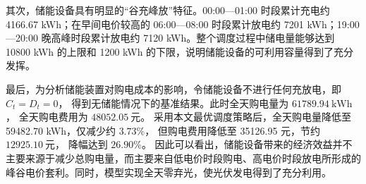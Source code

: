 其次，储能设备具有明显的“谷充峰放”特征。00:00—01:00 时段累计充电约 4166.67 kWh；在早间电价较高的 06:00—08:00 时段累计放电约 7201 kWh；19:00—20:00 晚高峰时段累计放电约 7120 kWh。整个调度过程中储电量能够达到 10800 kWh 的上限和 1200 kWh 的下限，说明储能设备的可利用容量得到了充分发挥。

最后，为分析储能装置对购电成本的影响，令储能设备不进行任何充放电，即 \(C_t=D_t=0\)， 得到无储能情况下的基准结果。此时全天购电量为 \(61789.94\ \mathrm{kWh}\)， 全天购电费用为 \(48052.05\ \mathrm{元}\)。 采用本文最优调度策略后，全天购电量降低至 59482.70 kWh，仅减少约 \(3.73\%\)， 但购电费用降低至 35126.95 元，节约 \(12925.10\ \mathrm{元}\)， 降幅达到 \(\boxed{26.90\%}\)。 因此可以看出，储能设备带来的经济效益并不主要来源于减少总购电量，而主要来自低电价时段购电、高电价时段放电所形成的峰谷电价套利。同时，模型实现全天零弃光，使光伏发电得到了充分利用。
